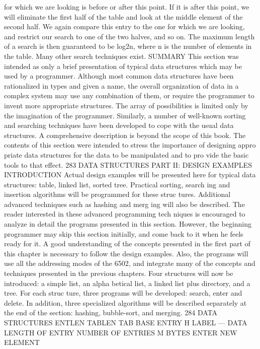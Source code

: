 {for which we are looking is before or after this point. If it
is after this point, we will eliminate the first half of the table and
look at the middle element of the second half. We again compare
this entry to the one for which we are looking, and restrict our search
to one of the two halves, and so on. The maximum length of a
search is then guaranteed to be log2n, where n is the number of
elements in the table.
Many other search techniques exist.
SUMMARY
This section was intended as only a brief presentation of typical
data structures which may be used by a programmer. Although
most common data structures have been rationalized in types and
given a name, the overall organization of data in a complex system
may use any combination of them, or require the programmer to
invent more appropriate structures. The array of possibilities is
limited only by the imagination of the programmer. Similarly, a
number of well-known sorting and searching techniques have been
developed to cope with the usual data structures. A comprehensive
description is beyond the scope of this book. The contents of this
section were intended to stress the importance of designing appro
priate data structures for the data to be manipulated and to pro
vide the basic tools to that effect.
283
DATA STRUCTURES
PART II: DESIGN EXAMPLES
INTRODUCTION
Actual design examples will be presented here for typical data
structures: table, linked list, sorted tree. Practical sorting, search
ing and insertion algorithms will be programmed for these struc
tures. Additional advanced techniques such as hashing and merg
ing will also be described.
The reader interested in these advanced programming tech
niques is encouraged to analyze in detail the programs presented
in this section. However, the beginning programmer may skip this
section initially, and come back to it when he feels ready for it.
A good understanding of the concepts presented in the first part
of this chapter is necessary to follow the design examples. Also,
the programs will use all the addressing modes of the 6502, and
integrate many of the concepts and techniques presented in the
previous chapters.
Four structures will now be introduced: a simple list, an alpha
betical list, a linked list plus directory, and a tree. For each struc
ture, three programs will be developed: search, enter and delete.
In addition, three specialized algorithms will be described separately
at the end of the section: hashing, bubble-sort, and merging.
284
DATA STRUCTURES
ENTLEN
TABLEN
TAB BASE
ENTRY
H LABEL —
DATA
LENGTH OF ENTRY
NUMBER OF ENTRIES
M BYTES
ENTER NEW ELEMENT
}
